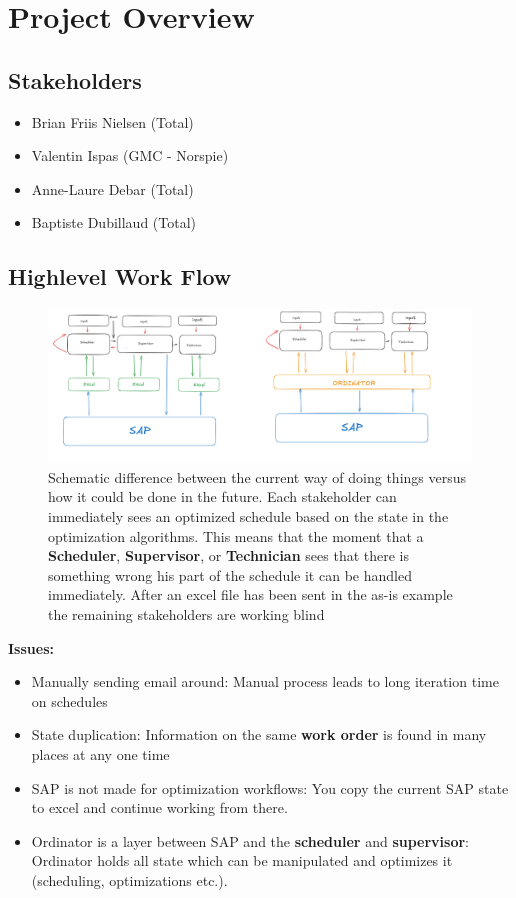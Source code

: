 \documentclass{article}
\begin{document}
\tableofcontents

\newpage
\section{Project Overview}
\subsection{Stakeholders}

\begin{itemize}
    \item Brian Friis Nielsen (Total)
    \item Valentin Ispas      (GMC - Norspie)
    \item Anne-Laure Debar    (Total)
    \item Baptiste Dubillaud  (Total)
\end{itemize}

\subsection{Highlevel Work Flow}
\begin{figure}[H]
    \includegraphics[width=1.0\textwidth]{../../../project-plans/scipo-total/figures/scheduling-as-is-to-be.png}
    \caption{Schematic difference between the current way of doing things versus how it could be done in the
    future. Each stakeholder can immediately sees an optimized schedule based on the state in the optimization
    algorithms. This means that the moment that a \textbf{Scheduler}, \textbf{Supervisor}, or \textbf{Technician}
    sees that there is something wrong his part of the schedule it can be handled immediately. After an excel file
    has been sent in the as-is example the remaining stakeholders are working blind}
\end{figure}

\textbf{Issues:}
\begin{itemize}
    \item Manually sending email around: Manual process leads to long iteration time on schedules
    \item State duplication: Information on the same \textbf{work order} is found in many places at any one time
    \item SAP is not made for optimization workflows: You copy the current SAP state to excel and continue working from there.
    \item Ordinator is a layer between SAP and the \textbf{scheduler} and \textbf{supervisor}: Ordinator holds all state which can be manipulated and optimizes it (scheduling, optimizations etc.).
\end{itemize}
\end{document}
